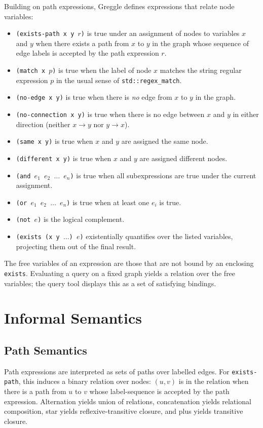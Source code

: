 \documentclass[11pt]{article}
\begin{document}
Building on path expressions, Greggle defines expressions that relate node variables:
\begin{itemize}[leftmargin=*]
  \item \texttt{(exists-path x y $r$)} is true under an assignment of nodes to variables $x$ and $y$ when there exists a path from $x$ to $y$ in the graph whose sequence of edge labels is accepted by the path expression $r$.
  \item \texttt{(match x $p$)} is true when the label of node $x$ matches the string regular expression $p$ in the usual sense of \texttt{std::regex\_match}.
  \item \texttt{(no-edge x y)} is true when there is \emph{no} edge from $x$ to $y$ in the graph.
  \item \texttt{(no-connection x y)} is true when there is no edge between $x$ and $y$ in either direction (neither $x \to y$ nor $y \to x$).
  \item \texttt{(same x y)} is true when $x$ and $y$ are assigned the same node.
  \item \texttt{(different x y)} is true when $x$ and $y$ are assigned different nodes.
  \item \texttt{(and $e_1$ $e_2$ $\dots$ $e_n$)} is true when all subexpressions are true under the current assignment.
  \item \texttt{(or $e_1$ $e_2$ $\dots$ $e_n$)} is true when at least one $e_i$ is true.
  \item \texttt{(not $e$)} is the logical complement.
  \item \texttt{(exists (x y $\dots$) $e$)} existentially quantifies over the listed variables, projecting them out of the final result.
\end{itemize}

The free variables of an expression are those that are not bound by an enclosing \texttt{exists}. Evaluating a query on a fixed graph yields a relation over the free variables; the query tool displays this as a set of satisfying bindings.

\section{Informal Semantics}

\subsection{Path Semantics}

Path expressions are interpreted as sets of paths over labelled edges. For \texttt{exists-path}, this induces a binary relation over nodes: $(u,v)$ is in the relation when there is a path from $u$ to $v$ whose label-sequence is accepted by the path expression. Alternation yields union of relations, concatenation yields relational composition, star yields reflexive-transitive closure, and plus yields transitive closure.
\end{document}
